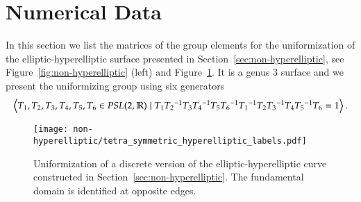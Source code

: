 \documentclass[Thesis.tex]{subfiles}
\begin{document}
\subfilebibliography

  \section{Numerical Data}

  In this section we list the matrices of the group elements for the uniformization of the elliptic-hyperelliptic surface presented in Section~\ref{sec:non-hyperelliptic}, see Figure~\ref{fig:non-hyperelliptic} (left) and Figure~\ref{fig:elliptic-hyperelliptic-data}. It is a genus $3$ surface and we present the uniformizing group using six generators
  \[
  \left<T_1,T_2,T_3,T_4,T_5,T_6 \in {\it PSL}(2,\mathbb R) \mid T_1{T_2}^{-1}T_3{T_4}^{-1}T_5{T_6}^{-1} {T_1}^{-1}T_2{T_3}^{-1}T_4{T_5}^{-1}T_6 = 1
  \right>.
  \]

  \begin{figure}
  \centering
  \texttt{[image: non-hyperelliptic/tetra\_symmetric\_hyperelliptic\_labels.pdf]}
  \caption{Uniformization of a discrete version of the elliptic-hyperelliptic curve constructed in Section~\ref{sec:non-hyperelliptic}.  The fundamental domain is identified at opposite edges.}
  \label{fig:elliptic-hyperelliptic-data}
  \end{figure}

  
\end{document}
